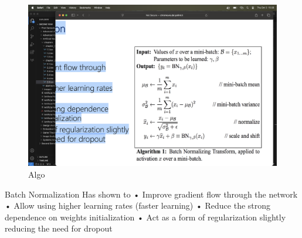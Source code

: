 \begin{figure}[H]
    \centering
    \includegraphics[width=0.75\linewidth]{images/algo.png}
    \caption{Algo}
\end{figure}



Batch Normalization
Has shown to
• Improve gradient flow through
the network
• Allow using higher learning rates
(faster learning)
• Reduce the strong dependence
on weights initialization
• Act as a form of regularization slightly
reducing the need for dropout